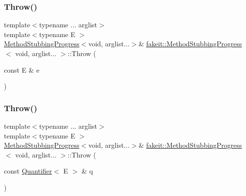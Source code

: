 \mbox{\label{structfakeit_1_1MethodStubbingProgress_3_01void_00_01arglist_8_8_8_01_4_a8b0d920dc6424eadd7dce7cb9df66814}} 
\subsubsection{\texorpdfstring{Throw()}{Throw()}\hspace{0.1cm}{\footnotesize\ttfamily [25/27]}}
{\footnotesize\ttfamily template$<$typename ... arglist$>$ \\
template$<$typename E $>$ \\
\mbox{\hyperlink{structfakeit_1_1MethodStubbingProgress}{Method\+Stubbing\+Progress}}$<$void, arglist...$>$\& \mbox{\hyperlink{structfakeit_1_1MethodStubbingProgress}{fakeit\+::\+Method\+Stubbing\+Progress}}$<$ void, arglist... $>$\+::Throw (\begin{DoxyParamCaption}\item[{const E \&}]{e }\end{DoxyParamCaption})\hspace{0.3cm}{\ttfamily [inline]}}

\mbox{\label{structfakeit_1_1MethodStubbingProgress_3_01void_00_01arglist_8_8_8_01_4_a9eb6f25dd382ef939b775345205f42c1}} 
\subsubsection{\texorpdfstring{Throw()}{Throw()}\hspace{0.1cm}{\footnotesize\ttfamily [26/27]}}
{\footnotesize\ttfamily template$<$typename ... arglist$>$ \\
template$<$typename E $>$ \\
\mbox{\hyperlink{structfakeit_1_1MethodStubbingProgress}{Method\+Stubbing\+Progress}}$<$void, arglist...$>$\& \mbox{\hyperlink{structfakeit_1_1MethodStubbingProgress}{fakeit\+::\+Method\+Stubbing\+Progress}}$<$ void, arglist... $>$\+::Throw (\begin{DoxyParamCaption}\item[{const \mbox{\hyperlink{structfakeit_1_1Quantifier}{Quantifier}}$<$ E $>$ \&}]{q }\end{DoxyParamCaption})\hspace{0.3cm}{\ttfamily [inline]}}

